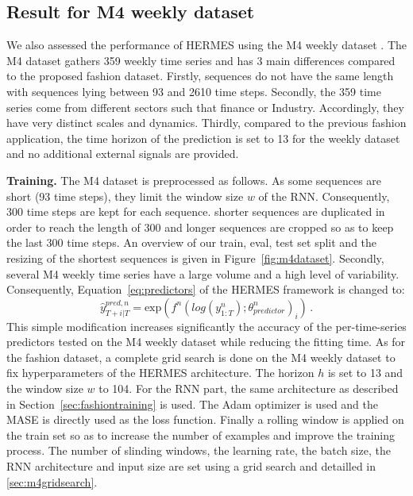 \documentclass[10pt]{article} %
\newcommand{\ts}{y}
\newcommand{\tspred}{\widehat{\ts}}
\newcommand{\stat}{f}
\newcommand{\statparam}{\theta_{predictor}}
\begin{document}
\subsection{Result for M4 weekly dataset}
\label{sec:m4result}

We also assessed the performance of HERMES using the M4 weekly dataset \citep{makridakis2020}. The M4 dataset gathers 359 weekly time series and has 3 main differences compared to the proposed fashion dataset. Firstly, sequences do not have the same length with sequences lying between 93 and 2610 time steps. Secondly, the 359 time series come from different sectors such that finance or Industry. Accordingly, they have very distinct scales and dynamics. Thirdly, compared to the previous fashion application, the time horizon of the prediction is set to 13 for the weekly dataset and no additional external signals are provided.

\textbf{Training. }
The M4 dataset is preprocessed as follows. As some sequences are short (93 time steps), they limit the window size $w$ of the RNN.  
Consequently, 300 time steps are kept for each sequence. shorter sequences are duplicated in order to reach the length of 300 and longer sequences are cropped so as to keep the last 300 time steps. An overview of our train, eval, test set split and the resizing of the shortest sequences is given in Figure~\ref{fig:m4dataset}. Secondly, several M4 weekly time series have a large volume and a high level of variability. Consequently, Equation~\ref{eq:predictors} of the HERMES framework is changed to:
\begin{equation}
    \tspred^{pred,n}_{T+i|T} =\mbox{exp}\left( \stat^n(log\left(\ts^n_{1:T}\right);\statparam^n)_i\right)\,.
\end{equation}
This simple modification increases significantly the accuracy of the per-time-series predictors tested on the M4 weekly dataset while reducing the fitting time. As for the fashion dataset, a complete grid search is done on the M4 weekly dataset to fix hyperparameters of the HERMES architecture. The horizon $h$ is set to 13 and the window size $w$ to 104. For the RNN part, the same architecture as described in Section~\ref{sec:fashiontraining} is used. The Adam optimizer is used and the MASE is directly used as the loss function. Finally a rolling window is applied on the train set so as to increase the number of examples and improve the training process. The number of slinding windows, the learning rate, the batch size, the RNN architecture and input size are set using a grid search and detailled in \ref{sec:m4gridsearch}.
\end{document}
